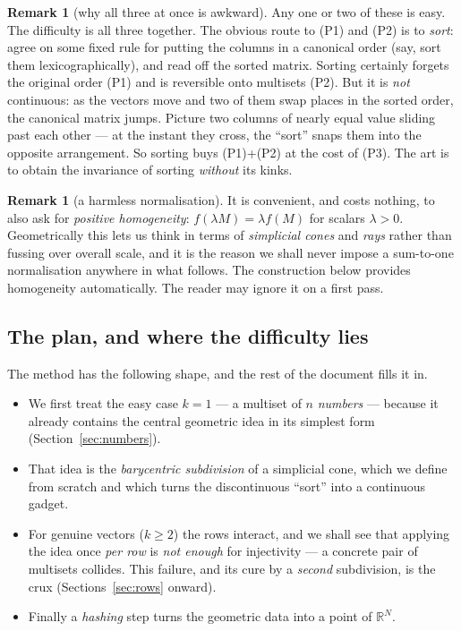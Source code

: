 \documentclass[11pt,a4paper]{article}
\theoremstyle{definition}
\newtheorem{remark}[definition]{Remark}
\theoremstyle{plain}
\newcommand{\R}{\mathbb{R}}
\begin{document}
\begin{remark}[why all three at once is awkward]\label{rmk:tension}
Any one or two of these is easy. The difficulty is all three together.
The obvious route to (P1) and (P2) is to \emph{sort}: agree on some fixed rule
for putting the columns in a canonical order (say, sort them
lexicographically), and read off the sorted matrix. Sorting certainly forgets
the original order (P1) and is reversible onto multisets (P2). But it is
\emph{not} continuous: as the vectors move and two of them swap places in the
sorted order, the canonical matrix jumps. Picture two columns of nearly equal
value sliding past each other --- at the instant they cross, the ``sort'' snaps
them into the opposite arrangement. So sorting buys (P1)+(P2) at the cost of
(P3). The art is to obtain the invariance of sorting \emph{without} its kinks.
\end{remark}

\begin{remark}[a harmless normalisation]\label{rmk:homog}
It is convenient, and costs nothing, to also ask for \emph{positive
homogeneity}: $f(\lambda M)=\lambda f(M)$ for scalars $\lambda>0$. Geometrically
this lets us think in terms of \emph{simplicial cones} and \emph{rays} rather
than fussing over overall scale, and it is the reason we shall never impose a
sum-to-one normalisation anywhere in what follows. The construction below
provides homogeneity automatically. The reader may ignore it on a first pass.
\end{remark}

\subsection{The plan, and where the difficulty lies}

The method has the following shape, and the rest of the document fills it in.
\begin{itemize}[leftmargin=*]
\item We first treat the easy case $k=1$ --- a multiset of $n$ \emph{numbers}
      --- because it already contains the central geometric idea in its
      simplest form (Section~\ref{sec:numbers}).
\item That idea is the \emph{barycentric subdivision} of a simplicial cone,
      which we define from scratch and which turns the discontinuous ``sort''
      into a continuous gadget.
\item For genuine vectors ($k\ge 2$) the rows interact, and we shall see that
      applying the idea once \emph{per row} is \emph{not enough} for injectivity
      --- a concrete pair of multisets collides. This failure, and its cure by a
      \emph{second} subdivision, is the crux (Sections~\ref{sec:rows}
      onward).
\item Finally a \emph{hashing} step turns the geometric data into a point of
      $\R^N$.
\end{itemize}
\end{document}
